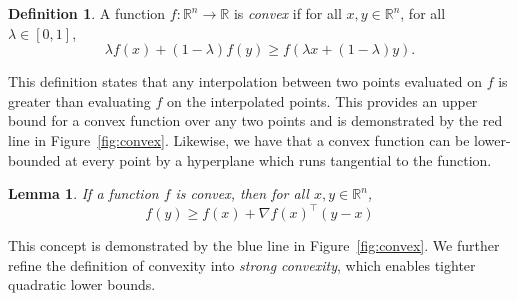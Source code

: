 \documentclass{article}
\newcommand{\R}{\mathbb R}
\newtheorem{lemma}{Lemma}
\theoremstyle{definition}
\newtheorem{definition}{Definition}
\begin{document}
\begin{definition}
    A function $f: \R^n \rightarrow \R$ is \emph{convex} if for all $x, y \in
    \R^n$, for all $\lambda \in [0, 1]$,
    \begin{equation}
        \lambda f(x) + (1 - \lambda)f(y) \geq f(\lambda x + (1 - \lambda)y).
    \end{equation}
\end{definition}

This definition states that any interpolation between two points
evaluated on $f$ is greater than evaluating $f$ on the interpolated points. This
provides an upper bound for a convex function over any two points and is
demonstrated by the red line in Figure~\ref{fig:convex}. Likewise, we
have that a convex function can be lower-bounded at every point by a hyperplane
which runs tangential to the function.

\begin{lemma}
    \label{lem:convex_bound}
    If a function $f$ is convex, then for all $x, y \in \R^n$,
    \begin{equation}
        f(y) \geq f(x) + \nabla {f(x)}^\intercal (y - x)
    \end{equation}
\end{lemma}

This concept is demonstrated by the blue line in Figure~\ref{fig:convex}. We
further refine the definition of convexity into \emph{strong convexity}, which
enables tighter quadratic lower bounds.
\end{document}
